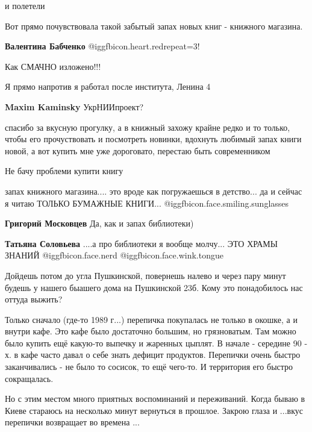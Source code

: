 \begin{itemize}
и полетели

Вот прямо почувствовала такой забытый запах новых книг - книжного магазина.

\textbf{Валентина Бабченко} @igg{fbicon.heart.red}{repeat=3}!

Как СМАЧНО изложено!!!

Я прямо напротив я работал после института, Ленина 4

\textbf{Maxim Kaminsky} УкрНИИпроект?


спасибо за вкусную прогулку, а в книжный захожу крайне редко и то только, чтобы
его прочуствовать и посмотреть новинки, вдохнуть любимый запах книги новой, а
вот купить мне уже дороговато, перестаю быть современником

Не бачу проблеми купити книгу


запах книжного магазина.... это вроде как погружаешься в детство... да и сейчас
я читаю ТОЛЬКО БУМАЖНЫЕ КНИГИ... @igg{fbicon.face.smiling.sunglasses} 

\begin{itemize} %
\textbf{Григорий Московцев} Да, как и запах библиотеки)

\textbf{Татьяна Соловьева} ....а про библиотеки я вообще молчу... ЭТО ХРАМЫ ЗНАНИЙ @igg{fbicon.face.nerd}  @igg{fbicon.face.wink.tongue} 
\end{itemize} %


Дойдешь потом до угла Пушкинской, повернешь налево и через пару минут будешь у
нашего быашего дома на Пушкинской 23б. Кому это понадобилось нас оттуда выжить?



Только сначало (где-то 1989 г...) перепичка покупалась не только в окошке, а и
внутри кафе. Это кафе было достаточно большим, но грязноватым. Там можно было
купить ещё какую-то выпечку и жаренных цыплят. В начале - середине 90 - х. в
кафе часто давал о себе знать дефицит продуктов. Перепички очень быстро
заканчивались - не было то сосисок, то ещё чего-то. И территория его быстро
сокращалась.

Но с этим местом много приятных воспоминаний и переживаний. Когда бываю в Киеве
стараюсь на несколько минут вернуться в прошлое. Закрою глаза и ...вкус
перепички возвращает во времена ...


\end{itemize}
